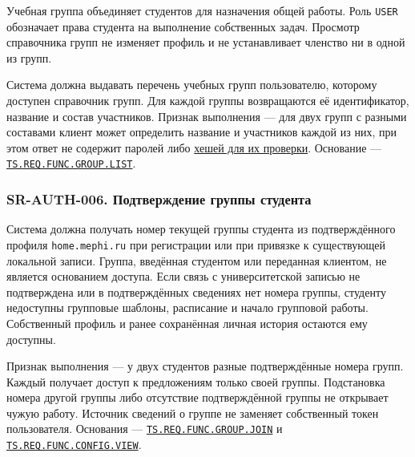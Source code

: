 \documentclass[12pt,a4paper]{article}
\begin{document}
\hypertarget{sr-auth-005-перечень-учебных-групп}{}

\hypertarget{sr-auth-005}{}

Учебная группа объединяет студентов для назначения общей работы. Роль \texttt{USER} обозначает права студента на выполнение собственных задач. Просмотр справочника групп не изменяет профиль и не устанавливает членство ни в одной из групп.

Система должна выдавать перечень учебных групп пользователю, которому доступен справочник групп. Для каждой группы возвращаются её идентификатор, название и состав участников. Признак выполнения --- для двух групп с разными составами клиент может определить название и участников каждой из них, при этом ответ не содержит паролей либо {\hyperlink{sr-auth-008-защита-паролей}{хешей для их проверки}}. Основание --- {\href{../02\_Техническое\_задание/DOC-02\_Техническое\_задание.pdf\#ts-req-func-group-list}{\texttt{TS.\allowbreak{}REQ.\allowbreak{}FUNC.\allowbreak{}GROUP.\allowbreak{}LIST}}}.

\subsubsection{SR-AUTH-006. Подтверждение группы студента}\label{sr-auth-006-ux43fux43eux434ux442ux432ux435ux440ux436ux434ux435ux43dux438ux435-ux433ux440ux443ux43fux43fux44b-ux441ux442ux443ux434ux435ux43dux442ux430}

\hypertarget{sr-auth-006-подтверждение-группы-студента}{}

\hypertarget{sr-auth-006}{}

Система должна получать номер текущей группы студента из подтверждённого профиля \texttt{home.\allowbreak{}mephi.\allowbreak{}ru} при регистрации или при привязке к существующей локальной записи. Группа, введённая студентом или переданная клиентом, не является основанием доступа. Если связь с университетской записью не подтверждена или в подтверждённых сведениях нет номера группы, студенту недоступны групповые шаблоны, расписание и начало групповой работы. Собственный профиль и ранее сохранённая личная история остаются ему доступны.

Признак выполнения --- у двух студентов разные подтверждённые номера групп. Каждый получает доступ к предложениям только своей группы. Подстановка номера другой группы либо отсутствие подтверждённой группы не открывает чужую работу. Источник сведений о группе не заменяет собственный токен пользователя. Основания --- {\href{../02\_Техническое\_задание/DOC-02\_Техническое\_задание.pdf\#ts-req-func-group-join}{\texttt{TS.\allowbreak{}REQ.\allowbreak{}FUNC.\allowbreak{}GROUP.\allowbreak{}JOIN}}} и {\href{../02\_Техническое\_задание/DOC-02\_Техническое\_задание.pdf\#ts-req-func-config-view}{\texttt{TS.\allowbreak{}REQ.\allowbreak{}FUNC.\allowbreak{}CONFIG.\allowbreak{}VIEW}}}.
\end{document}
